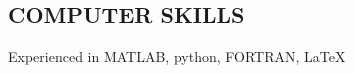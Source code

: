 \documentclass[10pt]{res} %
\begin{document}
\begin{resume}
\vspace{-10pt}

\section{COMPUTER SKILLS}

Experienced in MATLAB, python, FORTRAN, \LaTeX{}

\end{resume}
\end{document}
